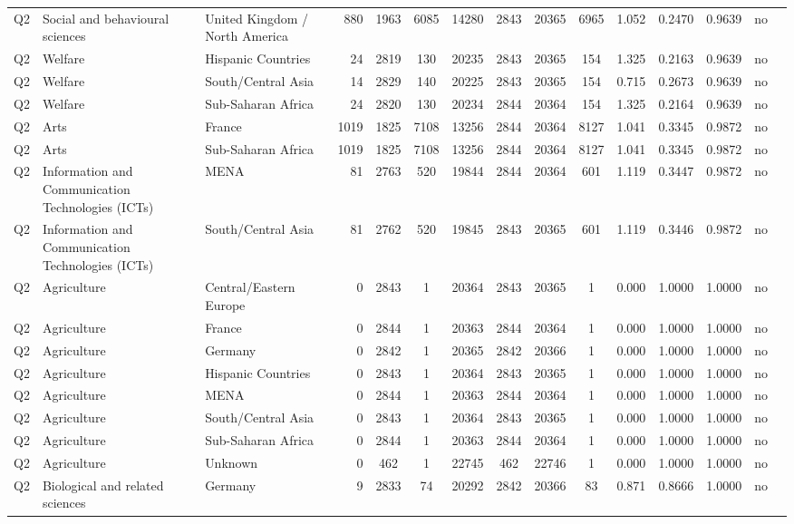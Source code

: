 \begin{longtable}{lllrcccccccccll}
Q2 & Social and behavioural sciences & United Kingdom / North America & 880 & 1963 & 6085 & 14280 & 2843 & 20365 & 6965 & 1.052 & 0.2470 & 0.9639 & no \\
Q2 & Welfare & Hispanic Countries & 24 & 2819 & 130 & 20235 & 2843 & 20365 & 154 & 1.325 & 0.2163 & 0.9639 & no \\
Q2 & Welfare & South/Central Asia & 14 & 2829 & 140 & 20225 & 2843 & 20365 & 154 & 0.715 & 0.2673 & 0.9639 & no \\
Q2 & Welfare & Sub-Saharan Africa & 24 & 2820 & 130 & 20234 & 2844 & 20364 & 154 & 1.325 & 0.2164 & 0.9639 & no \\
Q2 & Arts & France & 1019 & 1825 & 7108 & 13256 & 2844 & 20364 & 8127 & 1.041 & 0.3345 & 0.9872 & no \\
Q2 & Arts & Sub-Saharan Africa & 1019 & 1825 & 7108 & 13256 & 2844 & 20364 & 8127 & 1.041 & 0.3345 & 0.9872 & no \\
Q2 & Information and Communication Technologies (ICTs) & MENA & 81 & 2763 & 520 & 19844 & 2844 & 20364 & 601 & 1.119 & 0.3447 & 0.9872 & no \\
Q2 & Information and Communication Technologies (ICTs) & South/Central Asia & 81 & 2762 & 520 & 19845 & 2843 & 20365 & 601 & 1.119 & 0.3446 & 0.9872 & no \\
Q2 & Agriculture & Central/Eastern Europe & 0 & 2843 & 1 & 20364 & 2843 & 20365 & 1 & 0.000 & 1.0000 & 1.0000 & no \\
Q2 & Agriculture & France & 0 & 2844 & 1 & 20363 & 2844 & 20364 & 1 & 0.000 & 1.0000 & 1.0000 & no \\
Q2 & Agriculture & Germany & 0 & 2842 & 1 & 20365 & 2842 & 20366 & 1 & 0.000 & 1.0000 & 1.0000 & no \\
Q2 & Agriculture & Hispanic Countries & 0 & 2843 & 1 & 20364 & 2843 & 20365 & 1 & 0.000 & 1.0000 & 1.0000 & no \\
Q2 & Agriculture & MENA & 0 & 2844 & 1 & 20363 & 2844 & 20364 & 1 & 0.000 & 1.0000 & 1.0000 & no \\
Q2 & Agriculture & South/Central Asia & 0 & 2843 & 1 & 20364 & 2843 & 20365 & 1 & 0.000 & 1.0000 & 1.0000 & no \\
Q2 & Agriculture & Sub-Saharan Africa & 0 & 2844 & 1 & 20363 & 2844 & 20364 & 1 & 0.000 & 1.0000 & 1.0000 & no \\
Q2 & Agriculture & Unknown & 0 & 462 & 1 & 22745 & 462 & 22746 & 1 & 0.000 & 1.0000 & 1.0000 & no \\
Q2 & Biological and related sciences & Germany & 9 & 2833 & 74 & 20292 & 2842 & 20366 & 83 & 0.871 & 0.8666 & 1.0000 & no \\

\end{longtable}

